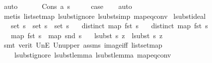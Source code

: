 \begin{isabellebody}
\ auto\isanewline
\ \ \isamarkupfalse%
\isanewline
{}\isamarkupfalse%
\isanewline
\ \ \isamarkupfalse%
\ {\isacharparenleft}{\kern0pt}Cons\ a\ s{}{\isacharparenright}{\kern0pt}\isanewline
\ \ \isamarkupfalse%
\ \isamarkupfalse%
\ {\isacharquery}{\kern0pt}case\isanewline
\ \ \isamarkupfalse%
\ auto\isanewline
\ \ \isamarkupfalse%
\ {\isacharparenleft}{\kern0pt}metis\ list{\isachardot}{\kern0pt}set{\isacharunderscore}{\kern0pt}map\ lsubst{\isacharunderscore}{\kern0pt}ignore\ lsubst{\isacharunderscore}{\kern0pt}simp\ map{\isacharunderscore}{\kern0pt}eq{\isacharunderscore}{\kern0pt}conv{\isacharparenright}{\kern0pt}\isanewline
{}\isamarkupfalse%
%
\endisatagproof
{\isafoldproof}%
%
\isadelimproof
\isanewline
%
\endisadelimproof
\isanewline
\isanewline
{}\isamarkupfalse%
\ lsubst{\isacharunderscore}{\kern0pt}ideal{\isacharcolon}{\kern0pt}\isanewline
\ \ \ {\isachardoublequoteopen}set\ s\ {\isacharequal}{\kern0pt}\ set\ s{}\ {\isasymunion}\ set\ s{}{\isachardoublequoteclose}\isanewline
\ \ \ {\isachardoublequoteopen}distinct\ {\isacharparenleft}{\kern0pt}map\ fst\ s{\isacharparenright}{\kern0pt}{\isachardoublequoteclose}\isanewline
\ \ \ {\isachardoublequoteopen}distinct\ {\isacharparenleft}{\kern0pt}map\ fst\ s{}{\isacharparenright}{\kern0pt}{\isachardoublequoteclose}\isanewline
\ \ \ {\isachardoublequoteopen}map\ fst\ s{}\ {\isacharequal}{\kern0pt}\ map\ snd\ s{}{\isachardoublequoteclose}\isanewline
\ \ \ {\isachardoublequoteopen}lsubst\ s\ z\ {\isacharequal}{\kern0pt}\ lsubst\ s{}\ z{\isachardoublequoteclose}\isanewline
%
\isadelimproof
%
\endisadelimproof
%
\isatagproof
{}\isamarkupfalse%
\ {\isacharparenleft}{\kern0pt}smt\ {\isacharparenleft}{\kern0pt}verit{\isacharparenright}{\kern0pt}\ UnE\ Un{\isacharunderscore}{\kern0pt}upper{}\ assms{\isacharparenleft}{\kern0pt}{}{\isacharcomma}{\kern0pt}{}{\isacharcomma}{\kern0pt}{}{\isacharcomma}{\kern0pt}{}{\isacharparenright}{\kern0pt}\ image{\isacharunderscore}{\kern0pt}iff\ list{\isachardot}{\kern0pt}set{\isacharunderscore}{\kern0pt}map\isanewline
\ \ \ \ lsubst{\isacharunderscore}{\kern0pt}ignore\ lsubst{\isacharunderscore}{\kern0pt}lemma{}\ lsubst{\isacharunderscore}{\kern0pt}lemma{}\ map{\isacharunderscore}{\kern0pt}eq{\isacharunderscore}{\kern0pt}conv\isanewline

\end{isabellebody}

